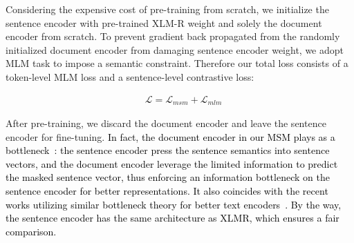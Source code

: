 \documentclass{article} %
\begin{document}


Considering the expensive cost of pre-training from scratch, we initialize the sentence encoder with pre-trained XLM-R weight and solely the document encoder from scratch. 
To prevent gradient back propagated from the randomly initialized document encoder from damaging sentence encoder weight, we adopt MLM task to impose a semantic constraint. Therefore our total loss consists of a token-level MLM loss and a sentence-level contrastive loss:


\begin{equation}
\label{eq:all}
\begin{aligned}
     & \mathcal{L} = \mathcal{L}_{msm} + \mathcal{L}_{mlm}
\end{aligned}
\end{equation}


After pre-training, we discard the document encoder and leave the sentence encoder for fine-tuning. \textcolor{black}{
In fact, the document encoder in our MSM plays as a bottleneck~\citep{li-etal-2020-optimus}: the sentence encoder press the sentence semantics into sentence vectors, and the document encoder leverage the limited information to predict the masked sentence vector, thus enforcing an information bottleneck on the sentence encoder for better representations. It also coincides with the recent works utilizing similar bottleneck theory for better text encoders~\citep{lu-etal-2021-less, liu2022retromae}. By the way, the sentence encoder has the same architecture as XLMR, which ensures a fair comparison. 
}


\end{document}

